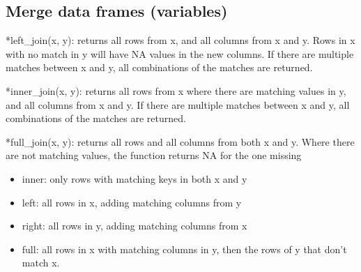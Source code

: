 \documentclass[
]{article}
\providecommand{\tightlist}{%
  \setlength{\itemsep}{0pt}\setlength{\parskip}{0pt}}
\begin{document}
\hypertarget{merge-data-frames-variables}{%
\subsection{Merge data frames (variables)}\label{merge-data-frames-variables}}

*left\_join(x, y): returns all rows from x, and all columns from x and y. Rows in x with no match in y will have NA values in the new columns. If there are multiple matches between x and y, all combinations of the matches are returned.

*inner\_join(x, y): returns all rows from x where there are matching values in y, and all columns from x and y. If there are multiple matches between x and y, all combinations of the matches are returned.

*full\_join(x, y): returns all rows and all columns from both x and y. Where there are not matching values, the function returns NA for the one missing

\begin{itemize}
\tightlist
\item
  inner: only rows with matching keys in both x and y
\item
  left: all rows in x, adding matching columns from y
\item
  right: all rows in y, adding matching columns from x
\item
  full: all rows in x with matching columns in y, then the rows of y that don't match x.
\end{itemize}
\end{document}
